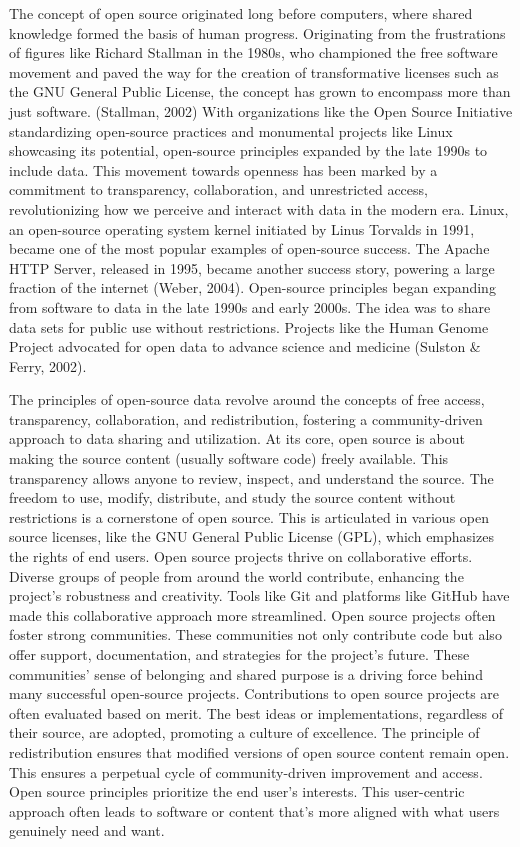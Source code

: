 \documentclass[print]{nuthesis}
\begin{document}
The concept of open source originated long before computers, where shared knowledge formed the basis of human progress.
Originating from the frustrations of figures like Richard Stallman in the 1980s, who championed the free software movement and paved the way for the creation of transformative licenses such as the GNU General Public License, the concept has grown to encompass more than just software. (Stallman, 2002)
With organizations like the Open Source Initiative standardizing open-source practices and monumental projects like Linux showcasing its potential, open-source principles expanded by the late 1990s to include data.
This movement towards openness has been marked by a commitment to transparency, collaboration, and unrestricted access, revolutionizing how we perceive and interact with data in the modern era.
Linux, an open-source operating system kernel initiated by Linus Torvalds in 1991, became one of the most popular examples of open-source success.
The Apache HTTP Server, released in 1995, became another success story, powering a large fraction of the internet (Weber, 2004).
Open-source principles began expanding from software to data in the late 1990s and early 2000s. The idea was to share data sets for public use without restrictions.
Projects like the Human Genome Project advocated for open data to advance science and medicine (Sulston \& Ferry, 2002).

The principles of open-source data revolve around the concepts of free access, transparency, collaboration, and redistribution, fostering a community-driven approach to data sharing and utilization.
At its core, open source is about making the source content (usually software code) freely available.
This transparency allows anyone to review, inspect, and understand the source.
The freedom to use, modify, distribute, and study the source content without restrictions is a cornerstone of open source.
This is articulated in various open source licenses, like the GNU General Public License (GPL), which emphasizes the rights of end users.
Open source projects thrive on collaborative efforts.
Diverse groups of people from around the world contribute, enhancing the project's robustness and creativity.
Tools like Git and platforms like GitHub have made this collaborative approach more streamlined.
Open source projects often foster strong communities.
These communities not only contribute code but also offer support, documentation, and strategies for the project's future.
These communities' sense of belonging and shared purpose is a driving force behind many successful open-source projects.
Contributions to open source projects are often evaluated based on merit.
The best ideas or implementations, regardless of their source, are adopted, promoting a culture of excellence.
The principle of redistribution ensures that modified versions of open source content remain open.
This ensures a perpetual cycle of community-driven improvement and access.
Open source principles prioritize the end user's interests.
This user-centric approach often leads to software or content that's more aligned with what users genuinely need and want.
\end{document}
